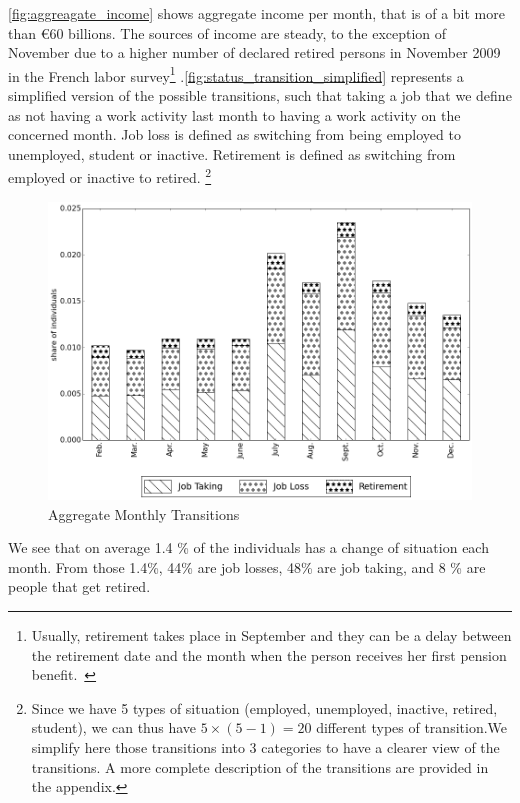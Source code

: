 \autoref{fig:aggreagate_income} shows aggregate income per month, that is of a
bit more than \euro60 billions. The sources of income are steady, to the
exception of November due to a higher number of declared retired persons in
November 2009 in the French labor survey\footnote{Usually, retirement takes
place in September and they can be a delay between the retirement date and the
month when the person receives her first pension benefit.\ }%
.\autoref{fig:status_transition_simplified} represents a simplified version of
the possible transitions, such that taking a job that we define as not having
a work activity last month to having a work activity on the concerned month.
Job loss is defined as switching from being employed to unemployed, student or
inactive. Retirement is defined as switching from employed or inactive to
retired. \footnote{Since we have 5 types of situation (employed, unemployed,
inactive, retired, student), we can thus have $5\times(5-1)=20$ different
types of transition.We simplify here those transitions into 3 categories to
have a clearer view of the transitions. A more complete description of the
transitions are provided in the appendix.} \medskip

\begin{figure}
\caption{Aggregate Monthly Transitions}%
\label{fig:status_transition_simplified}
\begin{center}
\includegraphics[width=\textwidth]{passage_barplot_simplified_proportions.png}
\end{center}
\end{figure}

We see that on average 1.4 \% of the individuals has a change of situation
each month. From those 1.4\%, 44\% are job losses, 48\% are job taking, and 8
\% are people that get retired.

